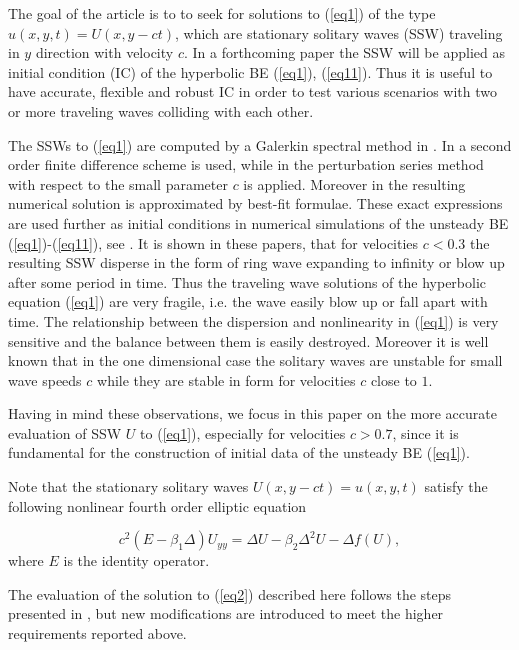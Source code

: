 \documentclass[preprint]{elsarticle}
\newcommand{\rf}[1]{(\ref{#1})}
\begin{document}
The goal of the article is to to seek for solutions to (\ref{eq1}) of the type $u(x,y,t)=U(x,y-ct)$, which 
are stationary solitary waves (SSW) traveling  in $y$ direction with velocity $c$. In a forthcoming paper the SSW will be applied as initial condition (IC) of the hyperbolic BE \rf{eq1}, \rf{eq11}. Thus it is useful to have accurate, flexible 
and robust IC in order to test various scenarios with two or more traveling waves colliding with each other.

The SSWs to \rf{eq1} are computed by a Galerkin spectral method in \cite{chr-chr-07,chr-chr}.
In \cite{Ch2012} a second order  finite difference scheme is used, while in \cite{Ch2011} 
the perturbation series method with respect to the small parameter $c$ is applied.  Moreover in \cite{Ch2011} 
the resulting numerical solution is approximated by best-fit formulae. These exact expressions are used further as initial conditions in 
numerical simulations of the unsteady BE \rf{eq1}-\rf{eq11}, see  \cite{cher,dani}. It is shown in these papers, 
that for velocities $c<0.3$ the resulting SSW disperse in the form of ring wave expanding to infinity or blow up after some period in time. 
Thus the traveling wave solutions of the hyperbolic equation  \rf{eq1} are very fragile, i.e. the wave easily blow up or fall apart with time. 
The relationship between the dispersion and nonlinearity in \rf{eq1} is very sensitive  and the balance between them is easily destroyed.
Moreover it is well known  that in the one dimensional case the solitary waves are unstable  
for small wave speeds $c$ while they are stable in form for  velocities $c$ close to $1$. 


Having in mind these  observations, we focus in this paper on the more accurate evaluation of SSW $U$ to \rf{eq1}, especially for  velocities $c > 0.7$, since it is fundamental for the construction of initial data of the unsteady BE \rf{eq1}. 

Note that the stationary solitary waves $U(x,y-ct)=u(x,y,t)$
 satisfy the following nonlinear fourth order elliptic equation

\begin{equation}\label{eq2}
c^2 (E-\beta_1 \Delta) U_{yy} = \Delta U -\beta_2 \Delta^2 U - \Delta f(U),
\end{equation}
where $E$ is the identity operator. 

The evaluation of the solution to \rf{eq2} described here follows the steps presented in \cite{Ch2012},
but new modifications are introduced to meet the higher requirements reported above.
\end{document}
